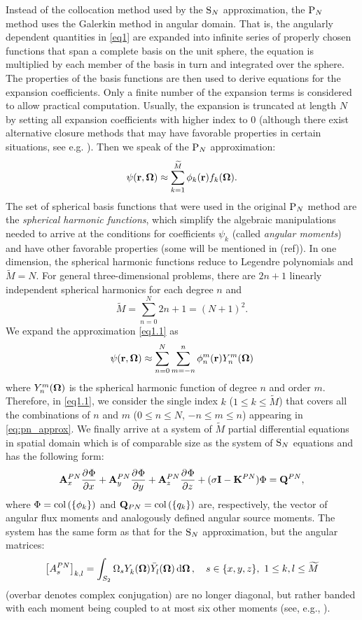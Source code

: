 Instead of the collocation method used by the $\SN$ approximation, the $\PN$ method uses the Galerkin method in
angular domain. That is, the angularly dependent quantities in \eqref{eq1} are expanded into infinite series of properly
chosen functions that span a complete basis on the unit sphere, the equation is multiplied by each member of the basis in turn and integrated over the sphere. The properties of the basis functions are then used to derive
equations for the expansion coefficients. Only a finite number of the expansion terms is considered to allow practical
computation. Usually, the expansion is truncated at length $N$ by setting all expansion coefficients with higher index
to 0 (although there exist alternative closure methods that may have favorable properties in certain situations, see
e.g. \cite{Frank0}). Then we speak of the $\PN$ approximation:
\begin{equation}\label{eq1.1}
  \psi(\br,\bomega) \approx \sum_{k=1}^{\widetilde M} \phi_k(\br) f_k(\bomega).
\end{equation}
The set of spherical basis functions that were used in the original $\PN$ method are the
\textit{spherical harmonic functions}, which simplify the algebraic manipulations needed to arrive at the conditions 
for coefficients $\psi_k$ (called \textit{angular moments}) and have other favorable properties (some will be mentioned
in \alert(ref)). In one dimension, the spherical harmonic functions reduce to Legendre polynomials and $\widetilde M = N$. For general three-dimensional
problems, there are $2n + 1$ linearly independent spherical harmonics for each degree $n$ and
$$
	\widetilde M = \sum_{n=0}^{N} 2n + 1 = (N+1)^2.
$$
We expand the approximation \eqref{eq1.1} as
\begin{equation}\label{eq:pn_approx}
	\psi(\br,\bomega) \approx \suma[n]{0}{N}\suma[m]{-n}{n}\angmom{n}{m}(\br)\Y{n}{m}(\bomega)
\end{equation}
where $\Y{n}{m}(\bomega)$ is the spherical harmonic function of degree $n$ and order $m$. Therefore, in \eqref{eq1.1},
we consider the single index $k$ ($1 \leq k \leq \widetilde M$) that covers all the combinations of $n$ and $m$ ($0 \leq n
\leq N$, $-n\leq m \leq n$) appearing in \eqref{eq:pn_approx}. We finally arrive at a system of $\widetilde M$ partial
differential equations in spatial domain which is of comparable size as the system of $\SN$ equations and has the following form:
\begin{equation}\label{eq:pn1}
	\mat{A}^{PN}_x\pd{\Phi}{x} + \mat{A}^{PN}_y\pd{\Phi}{y} + \mat{A}^{PN}_z\pd{\Phi}{z} + (\sigma\mat{I} -
	\mat{K}^{PN})\Phi = \mat{Q}^{PN},
\end{equation}
where $\Phi = \col(\{\phi_k\})$ and $\mat{Q}_{PN} = \col(\{q_k\})$ are, respectively, the vector of angular flux
moments and analogously defined angular source moments. The system has the same form as that for
the $\SN$ approximation, but the angular matrices:
$$
	\left[A^{PN}_s\right]_{k,l} = \intA{\Omega_s \Y{k}{}(\bomega)\Yc{l}{}(\bomega)},\quad s\in\{x,y,z\},\ 
	1 \leq k,l \leq \widetilde M
$$
(overbar denotes complex conjugation) are no longer diagonal, but rather banded with each moment being coupled to at
most six other moments (see, e.g., \cite{Sanchez7}).

